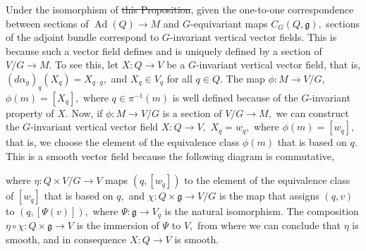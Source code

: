 \documentclass[12pt, letterpaper, reqno]{amsart}
\theoremstyle{definition}
\theoremstyle{plain}
\theoremstyle{remark}
\providecommand{\DIFadd}[1]{{\protect\color{blue}\uwave{#1}}} %
\providecommand{\DIFdel}[1]{{\protect\color{red}\sout{#1}}}                      %
\providecommand{\DIFaddbegin}{} %
\providecommand{\DIFaddend}{} %
\providecommand{\DIFdelbegin}{} %
\providecommand{\DIFdelend}{} %
\newcommand{\DIFscaledelfig}{0.5}
\newlength{\DIFdelgraphicswidth} %
\newlength{\DIFdelgraphicsheight} %
\newcommand{\DIFaddincludegraphics}[2][]{{\color{blue}\fbox{\DIFOincludegraphics[#1]{#2}}}} %
\newcommand{\DIFdelincludegraphics}[2][]{%
\sbox{\DIFdelgraphicsbox}{\DIFOincludegraphics[#1]{#2}}%
\settoboxwidth{\DIFdelgraphicswidth}{\DIFdelgraphicsbox} %
\settoboxtotalheight{\DIFdelgraphicsheight}{\DIFdelgraphicsbox} %
\scalebox{\DIFscaledelfig}{%
\parbox[b]{\DIFdelgraphicswidth}{\usebox{\DIFdelgraphicsbox}\\[-\baselineskip] \rule{\DIFdelgraphicswidth}{0em}}\llap{\resizebox{\DIFdelgraphicswidth}{\DIFdelgraphicsheight}{%
\setlength{\unitlength}{\DIFdelgraphicswidth}%
\begin{picture}(1,1)%
\thicklines\linethickness{2pt} %
{\color[rgb]{1,0,0}\put(0,0){\framebox(1,1){}}}%
{\color[rgb]{1,0,0}\put(0,0){\line( 1,1){1}}}%
{\color[rgb]{1,0,0}\put(0,1){\line(1,-1){1}}}%
\end{picture}%
}\hspace*{3pt}}} %
} %
\DeclareRobustCommand{\DIFaddbegin}{\DIFOaddbegin \let\includegraphics\DIFaddincludegraphics} %
\DeclareRobustCommand{\DIFaddend}{\DIFOaddend \let\includegraphics\DIFOincludegraphics} %
\DeclareRobustCommand{\DIFdelbegin}{\DIFOdelbegin \let\includegraphics\DIFdelincludegraphics} %
\DeclareRobustCommand{\DIFdelend}{\DIFOaddend \let\includegraphics\DIFOincludegraphics} %
\begin{document}
Under the isomorphism of \DIFdelbegin \DIFdel{this Proposition}\DIFdelend \DIFaddbegin \DIFadd{proposition \ref{prop:isomorphism_vb}}\DIFaddend , given the one-to-one correspondence between sections of $ \operatorname{Ad} (Q)\rightarrow M $ and $ G $-equivariant maps $ C_G(Q, \mathfrak{g}), $ sections of the adjoint bundle correspond to $ G $-invariant vertical vector fields. This is because such a vector field defines and is uniquely defined by a section of $ V/G \rightarrow M. $ To see this, let $ X: Q \rightarrow V $ be a $ G $-invariant vertical vector field, that is, $ (d\alpha_g)_q(X_q) = X_{q\cdot g}, $ and $ X_q\in V_q $ for all $ q\in Q. $ The map $ \phi: M \rightarrow V/G $, $ \phi(m)= [X_q], $ where $ q\in \pi^{-1}(m) $ is well defined because of the $ G $-invariant property of $ X. $ Now, if $ \phi: M \rightarrow V/G $ is a section of $ V/G \rightarrow M, $ we can construct the $ G $-invariant vertical vector field $ X: Q \rightarrow V, $ $ X_q=w_q, $ where $ \phi(m)=[w_q], $ that is, we choose the element of the equivalence class $ \phi(m) $ that is based on $ q. $ This is a smooth vector field because the following diagram is commutative,
\begin{center}
\end{center}
where $ \eta: Q\times V/G \rightarrow V $ maps $ (q, [w_{\tilde q}]) $ to the element of the equivalence class of $ [w_{\tilde q}] $ that is based on $ q, $ and $ \chi: Q\times\mathfrak{g}\rightarrow V/G $ is the map that assigns $(q,v)$ to $ (q, [\Psi(v)]), $ where $ \Psi: \mathfrak{g} \rightarrow V_q $ is the natural isomorphism. The composition $ \eta\circ\chi: Q\times \mathfrak{g} \rightarrow V $ is the immersion of $ \Psi $ to $ V, $ from where we can conclude that $ \eta $ is smooth, and in consequence $ X:Q \rightarrow V $ is smooth.
\end{document}
